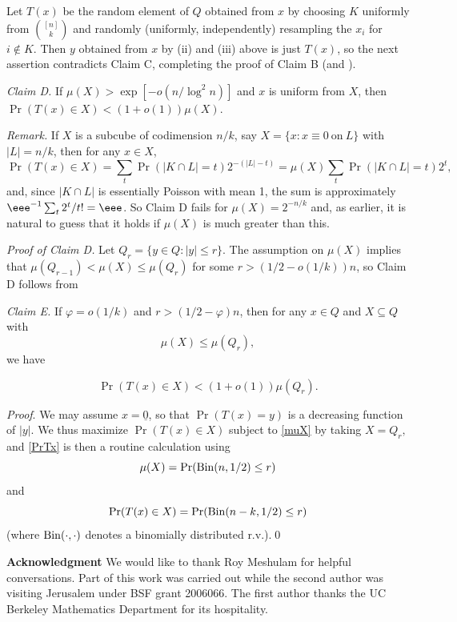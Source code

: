 \documentclass{toc}
\newcommand{\beq}[1]{\begin{equation}\label{#1}}
\newcommand{\enq}[0]{\end{equation}}
\newcommand{\mn}[0]{\medskip\noindent}
\newcommand{\sub}[0]{\subseteq}
\newcommand{\0}[0]{\emptyset}
\newcommand{\vp}[0]{\varphi}
\def\vp{\varphi}
\def\vp{\varphi}
\begin{document}
Let $T(x)$ be
the random element of $Q$ %
obtained %
from $x$
by choosing $K$ uniformly from $\binom{[n]}{k}$ and
randomly (uniformly, independently) 
resampling %
the %
$x_i$  %
%
%
%
for $i\not\in K$.    %
Then $y$ %
obtained  %
from $x$ by (ii) and (iii) above is just $T(x)$,
so
the next assertion contradicts Claim C, completing the proof of
Claim B (and ).



\mn
\emph{Claim D.}
If $\mu(X) > \exp[-o(n/\log^2n)]$
and $x$ is uniform from $X$, then $\Pr(T(x)\in X) < (1+o(1))\mu(X)$.

\mn
\emph{Remark.}
If $X$ is a subcube of codimension $n/k$, say
$X=\{x:x \equiv 0 ~\mbox{on}~L\}$ with $|L |=n/k$,
then for any $x\in X$,
$$
\Pr(T(x)\in X) =\sum_t\Pr(|K\cap L |=t)2^{-(|L|-t)}
=\mu(X)\sum_t\Pr(|K\cap L |=t)2^t,
$$
and, since $|K\cap L|$ is essentially Poisson with mean 1,
the sum is
approximately
$ \eee^{-1}\sum_t2^t/t! = \eee$.
So Claim D fails for $\mu(X) = 2^{-n/k}$ and, as earlier,
it is %
natural to guess that it holds if $\mu(X)$ is much
%
greater  %
than this.

\mn
\emph{Proof of Claim D.}
Let $Q_r=\{y\in Q:|y|\leq r\}$.
The assumption on $\mu(X)$ implies that
$\mu(Q_{r-1})<\mu(X) \leq \mu(Q_r)$
for some $r >(1/2-o(1/k))n$, so Claim D follows from

\mn
\emph{Claim E.}
If $\vp =o(1/k)$ and $r > (1/2-\vp)n$, then for any $x\in Q$ and
$X\sub Q$ with
\beq{muX}
\mu(X) \leq \mu(Q_r),
\enq
we have

\beq{PrTx}
\Pr(T(x)\in X) < (1+o(1))\mu(Q_r).
\enq

\mn
\emph{Proof}.
We may assume $x=\underline{0}$, so that $\Pr(T(x)=y)$ is a decreasing
function of $|y|$.
We thus maximize $\Pr(T(x)\in X)$
subject to \eqref{muX} by taking
$
X=Q_r,
$
and \eqref{PrTx} is then a routine calculation
using
$$\mu(X) =\Pr({\rm Bin}(n,1/2)\leq r)$$
and
$$\Pr(T(x)\in X) =\Pr({\rm Bin}(n-k,1/2)\leq r)$$
(where ${\rm Bin}(\cdot,\cdot)$ denotes a binomially
distributed r.v.).\qed


\mn
{\bf Acknowledgment}
We would like to thank Roy Meshulam for helpful conversations.
Part of this work was carried out while the second author
was visiting Jerusalem
under BSF grant 2006066.
The first author
%
%
thanks the UC Berkeley %
Mathematics Department  %
for its hospitality.

%


%
%
%
%

\end{document}
